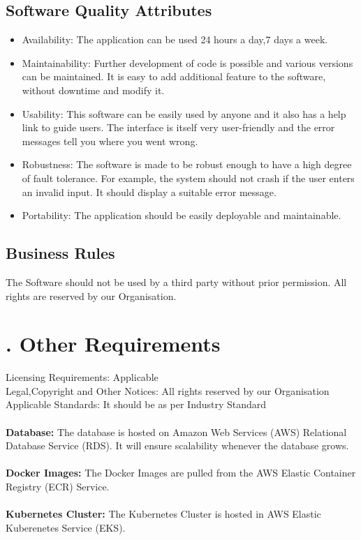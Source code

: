\documentclass{scrreprt}
\begin{document}
\section{Software Quality Attributes}
\begin{itemize}
\item Availability:
The application can be used 24 hours a day,7 days a week. \\

\item Maintainability: Further development of code is possible and various versions can be maintained. It is easy to add additional feature to the software, without downtime and modify it. \\
\item Usability: This software can be easily used by anyone and it also has a help link to guide
users. The interface is itself very user-friendly and the error messages tell you where
you went wrong. \\
\item Robustness:
The software is made to be robust enough to have a high degree of fault tolerance. For
example, the system should not crash if the user enters an invalid input. It should display
a suitable error message. \\
\item Portability:
 The application should be easily deployable and maintainable. \\
\end{itemize}


\section{Business Rules}
The Software should not be used by a third party without prior permission. All rights are
reserved by our Organisation. 

\chapter{. Other Requirements}
Licensing Requirements: Applicable \\
Legal,Copyright and Other Notices: All rights reserved by our Organisation \\
Applicable Standards: It should be as per Industry Standard \\ \\
 \textbf{Database: } The database is hosted on Amazon Web Services (AWS) Relational Database Service (RDS). It will ensure scalability whenever the database grows.\\\\
\textbf{Docker Images: } The Docker Images are pulled from the AWS Elastic Container Registry (ECR) Service.\\\\
\textbf{Kubernetes Cluster: } The Kubernetes Cluster is hosted in AWS Elastic Kuberenetes Service (EKS).
\end{document}

